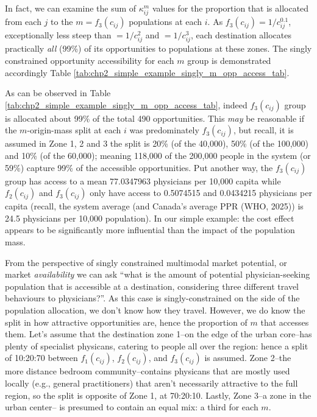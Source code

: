 \documentclass[
11pt, %
oneside, %
english, %
singlespacing, %
]{macthesis} %
\begin{document}
In fact, we can examine the sum of \(\kappa_{ij}^m\) values for the proportion that is allocated from each \(j\) to the \(m = f_3(c_{ij})\) populations at each \(i\). As \(f_3(c_{ij}) = 1/c_{ij}^0.1\), exceptionally less steep than \(= 1/c_{ij}^2\) and \(= 1/c_{ij}^3\), each destination allocates practically \emph{all} (99\%) of its opportunities to populations at these zones. The singly constrained opportunity accessibility for each \(m\) group is demonstrated accordingly Table \ref{tab:chp2_simple_example_singly_m_opp_access_tab}.



As can be observed in Table \ref{tab:chp2_simple_example_singly_m_opp_access_tab}, indeed \(f_3(c_{ij})\) group is allocated about 99\% of the total 490 opportunities. This \emph{may} be reasonable if the \(m\)-origin-mass split at each \(i\) was predominately \(f_3(c_{ij})\), but recall, it is assumed in Zone 1, 2 and 3 the split is 20\% (of the 40,000), 50\% (of the 100,000) and 10\% (of the 60,000); meaning 118,000 of the 200,000 people in the system (or 59\%) capture 99\% of the accessible opportunities. Put another way, the \(f_3(c_{ij})\) group has access to a mean 77.0347963 physicians per 10,000 capita while \(f_2(c_{ij})\) and \(f_3(c_{ij})\) only have access to 0.5074515 and 0.0434215 physicians per capita (recall, the system average (and Canada's average PPR (WHO, 2025)) is 24.5 physicians per 10,000 population). In our simple example: the cost effect appears to be significantly more influential than the impact of the population mass.

From the perspective of singly constrained multimodal market potential, or market \emph{availability} we can ask ``what is the amount of potential physician-seeking population that is accessible at a destination, considering three different travel behaviours to physicians?''. As this case is singly-constrained on the side of the population allocation, we don't know how they travel. However, we do know the split in how attractive opportunities are, hence the proportion of \(m\) that accesses them. Let's assume that the destination zone 1--on the edge of the urban core--has plenty of specialist physicans, catering to people all over the region: hence a split of 10:20:70 between \(f_1(c_{ij})\), \(f_2(c_{ij})\), and \(f_3(c_{ij})\) is assumed. Zone 2--the more distance bedroom community--contains physicans that are mostly used locally (e.g., general practitioners) that aren't necessarily attractive to the full region, so the split is opposite of Zone 1, at 70:20:10. Lastly, Zone 3--a zone in the urban center-- is presumed to contain an equal mix: a third for each \(m\).
\end{document}
